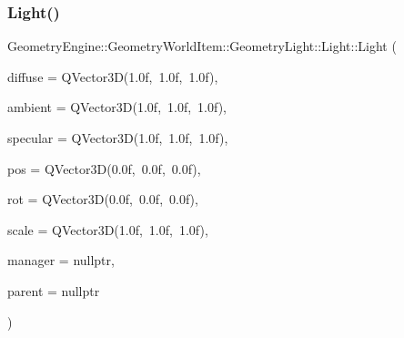 \subsubsection{\texorpdfstring{Light()}{Light()}\hspace{0.1cm}{\footnotesize\ttfamily [1/2]}}
{\footnotesize\ttfamily Geometry\+Engine\+::\+Geometry\+World\+Item\+::\+Geometry\+Light\+::\+Light\+::\+Light (\begin{DoxyParamCaption}\item[{const Q\+Vector3D \&}]{diffuse = {\ttfamily QVector3D(1.0f,~1.0f,~1.0f)},  }\item[{const Q\+Vector3D \&}]{ambient = {\ttfamily QVector3D(1.0f,~1.0f,~1.0f)},  }\item[{const Q\+Vector3D \&}]{specular = {\ttfamily QVector3D(1.0f,~1.0f,~1.0f)},  }\item[{const Q\+Vector3D \&}]{pos = {\ttfamily QVector3D(0.0f,~0.0f,~0.0f)},  }\item[{const Q\+Vector3D \&}]{rot = {\ttfamily QVector3D(0.0f,~0.0f,~0.0f)},  }\item[{const Q\+Vector3D \&}]{scale = {\ttfamily QVector3D(1.0f,~1.0f,~1.0f)},  }\item[{const \mbox{\hyperlink{class_geometry_engine_1_1_light_utils_1_1_light_component_manager}{Light\+Utils\+::\+Light\+Component\+Manager}} $\ast$const}]{manager = {\ttfamily nullptr},  }\item[{\mbox{\hyperlink{class_geometry_engine_1_1_geometry_world_item_1_1_world_item}{World\+Item}} $\ast$}]{parent = {\ttfamily nullptr} }\end{DoxyParamCaption})}

